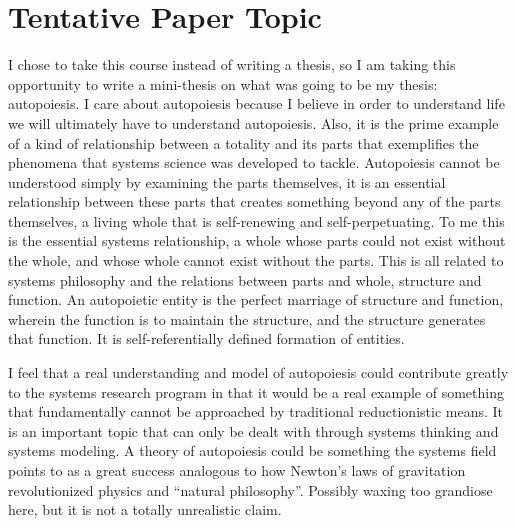 \documentclass[11pt]{article}
\begin{document}
\maketitle

\section{Tentative Paper Topic}

I chose to take this course instead of writing a thesis, so I am taking this opportunity to write a mini-thesis on what was going to be my thesis:  autopoiesis.  I care about autopoiesis because I believe in order to understand life we will ultimately have to understand autopoiesis.  Also, it is the prime example of a kind of relationship between a totality and its parts that exemplifies the phenomena that systems science was developed to tackle.  Autopoiesis cannot be understood simply by examining the parts themselves, it is an essential relationship between these parts that creates something beyond any of the parts themselves, a living whole that is self-renewing and self-perpetuating.  To me this is the essential systems relationship, a whole whose parts could not exist without the whole, and whose whole cannot exist without the parts.  This is all related to systems philosophy and the relations between parts and whole, structure and function.  An autopoietic entity is the perfect marriage of structure and function, wherein the function is to maintain the structure, and the structure generates that function.  It is self-referentially defined formation of entities.  

I feel that a real understanding and model of autopoiesis could contribute greatly to the systems research program in that it would be a real example of something that fundamentally cannot be approached by traditional reductionistic means.  It is an important topic that can only be dealt with through systems thinking and systems modeling.  A theory of autopoiesis could be something the systems field points to as a great success analogous to how Newton's laws of gravitation revolutionized physics and ``natural philosophy''.  Possibly waxing too grandiose here, but it is not a totally unrealistic claim.  
\end{document}
